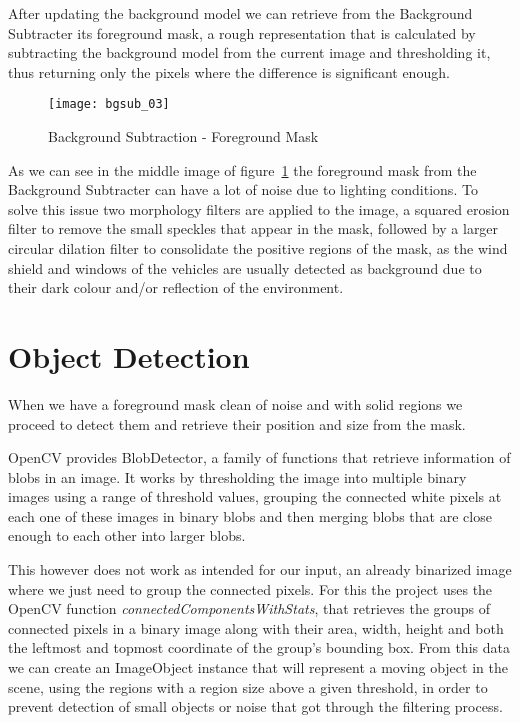 After updating the background model we can retrieve from the Background Subtracter its foreground mask, a rough representation that is calculated by subtracting the background model from the current image and thresholding it, thus returning only the pixels where the difference is significant enough.

\begin{figure}[t]
  \begin{center}
    \leavevmode
    \texttt{[image: bgsub\_03]}
    \caption{Background Subtraction - Foreground Mask}
    \label{fig:bgsub_02}
  \end{center}
\end{figure}

As we can see in the middle image of figure~\ref{fig:bgsub_02} the foreground mask from the Background Subtracter can have a lot of noise due to lighting conditions. To solve this issue two morphology filters are applied to the image, a squared erosion filter to remove the small speckles that appear in the mask, followed by a larger circular dilation filter to consolidate the positive regions of the mask, as the wind shield and windows of the vehicles are usually detected as background due to their dark colour and/or reflection of the environment.

\section{Object Detection}

When we have a foreground mask clean of noise and with solid regions we proceed to detect them and retrieve their position and size from the mask. 

OpenCV provides BlobDetector, a family of functions that retrieve information of blobs in an image. It works by thresholding the image into multiple binary images using a range of threshold values, grouping the connected white pixels at each one of these images in binary blobs and then merging blobs that are close enough to each other into larger blobs.

This however does not work as intended for our input, an already binarized image where we just need to group the connected pixels. For this the project uses the OpenCV function \textit{connectedComponentsWithStats}, that retrieves the groups of connected pixels in a binary image along with their area, width, height and both the leftmost and topmost coordinate of the group's bounding box. From this data we can create an ImageObject instance that will represent a moving object in the scene, using the regions with a region size above a given threshold, in order to prevent detection of small objects or noise that got through the filtering process.

